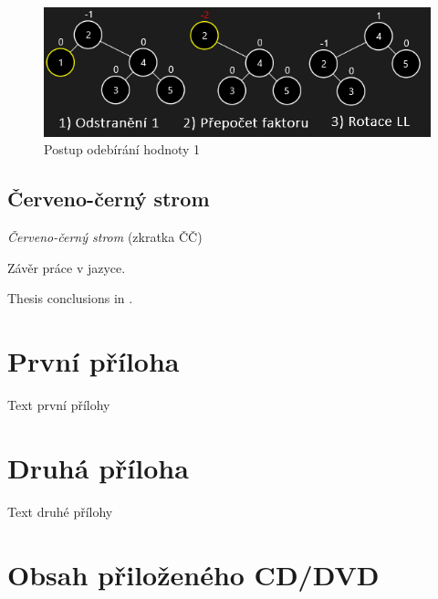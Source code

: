 \documentclass[
  biblatex=false,
  font=serif,
  glossaries=false,
  tables=false,
  theorems=false,
  index
]{kidiplom}
\begin{document}
\begin{figure}[h!]
\centering
	\includegraphics[scale=0.55]{obrazky/16AVLOdebirani.png}
	\caption{Postup odebírání hodnoty 1}
\end{figure}

\newpage
\subsection{Červeno-černý strom}
\indent\indent\textit{Červeno-černý strom} (zkratka ČČ)
 



\begin{kiconclusions}
Závěr práce v  jazyce.
\end{kiconclusions}

\begin{kiconclusions}[english]
Thesis conclusions in .
\end{kiconclusions}

\appendix

\section{První příloha}
Text první přílohy

\section{Druhá příloha}
Text druhé přílohy

\section{Obsah přiloženého CD/DVD} \label{sec:ObsahCD}
\end{document}
